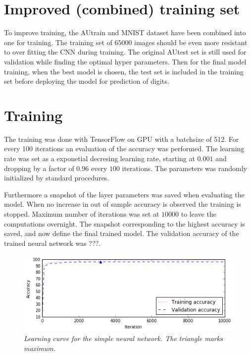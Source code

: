 \documentclass[a4paper,10pt,article,oneside,english]{memoir}
\let\oldcaption\caption
\renewcommand{\caption}[1]{\oldcaption{\emph{#1}}}
\begin{document}
	
	\section{Improved (combined) training set}
	To improve training, the AUtrain and MNIST dataset have been combined into one for training. The training set of $65000$ images should be even more resistant to over fitting the CNN during training. 
	The original AUtest set is still used for validation while finding the optimal hyper parameters. Then for the final model training, when the best model is chosen, the test set is included in the training set before deploying the model for prediction of digits. 
	
	
	\section{Training}
	The training was done with TensorFlow on GPU with a batchsize of 512. For every 100 iterations an evaluation of the accuracy was performed. 
	The learning rate was set as a exponetial decresing learning rate, starting at $0.001$ and dropping by a factor of $0.96$ every $100$ iterations. The parameters was randomly initialized by standard procedures.
	
	Furthermore a snapshot of the layer parameters was saved when evaluating the model. When no increase in out of sample accuracy is observed the training is stopped. Maximum number of iterations was set at $10000$ to leave the computations overnight. The snapshot corresponding to the highest accuracy is saved, and now define the final trained model. The validation accuracy of the trained neural network was ???. 
	
	\begin{figure}[h!]
		\centering
		\includegraphics[width=0.9\linewidth]{nn_learning.png}
		\caption{Learning curve for the simple neural network. The triangle marks maximum.}
		\label{fig:nn_learning}
	\end{figure}
	
	
	
	
	
\end{document}
